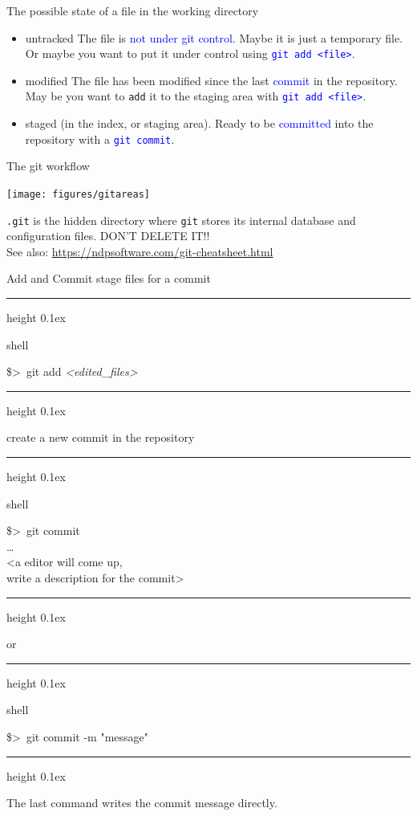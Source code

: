 \documentclass[hyperref={colorlinks}]{beamer}
\newenvironment{shell}{%
\footnotesize\flushleft\hrule height 0.1ex
\tt\begin{beamercolorbox}[sep=1ex,left]{shell}%
}{%
\end{beamercolorbox}
\hrule height 0.1ex
\endflushleft\par
}
\newcommand*{\psone}[1][ant]{\$>~}
\newcommand*{\var}[1]{{\it<#1>}}
\begin{document}
\begin{frame}{The possible state of a file in the working directory}
\begin{itemize}
\item \alert{untracked} The file is \textcolor{blue}{not under git control}. Maybe it is just a temporary file. Or maybe you want to put it under control using \textcolor{blue}{\texttt{git add <file>}}.

\item \alert{modified} The file has been modified since the last \textcolor{blue}{commit} in the repository. May be you want to \texttt{add} it to the staging area with \textcolor{blue}{\texttt{git add <file>}}.

\item \alert{staged} (in the index, or staging area). Ready to be \textcolor{blue}{committed} into the repository with a \textcolor{blue}{\texttt{git commit}}.
\end{itemize}
\end{frame}
\begin{frame}{The git workflow}
  \centerline{\texttt{[image: figures/gitareas]}}
  
  \alert{\texttt{.git}} is the \alert{hidden directory} where \texttt{git} stores its internal database and configuration files. \alert{DON'T DELETE IT!!}\\[3mm]
  
  See also: \url{https://ndpsoftware.com/git-cheatsheet.html}
\end{frame}

\begin{frame}{Add and Commit}
stage files for a commit
\begin{shell}
\psone git add \var{edited_files}
\end{shell}
create a new commit in the repository
\begin{shell}
\psone git commit \\
\ldots \\
<a editor will come up,\\ write a description for the commit>
\end{shell}
or
\begin{shell}
\psone git commit -m "message"\\
\end{shell}
The last command writes the commit message directly.
\end{frame}
\end{document}
